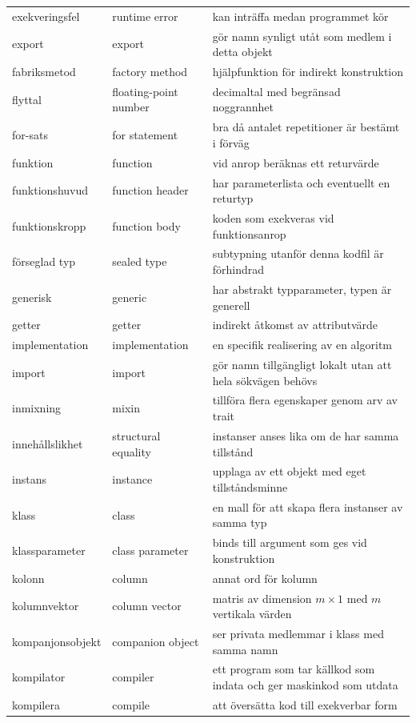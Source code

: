 \begin{tabular}{l|l|l}
exekveringsfel & runtime error & kan inträffa medan programmet kör \\
export & export & gör namn synligt utåt som medlem i detta objekt \\
fabriksmetod & factory method & hjälpfunktion för indirekt konstruktion \\
flyttal & floating-point number & decimaltal med begränsad noggrannhet \\
for-sats & for statement & bra då antalet repetitioner är bestämt i förväg \\
funktion & function & vid anrop beräknas ett returvärde \\
funktionshuvud & function header & har parameterlista och eventuellt en returtyp \\
funktionskropp & function body & koden som exekveras vid funktionsanrop \\
förseglad typ & sealed type & subtypning utanför denna kodfil är förhindrad \\
generisk & generic & har abstrakt typparameter, typen är generell \\
getter & getter & indirekt åtkomst av attributvärde \\
implementation & implementation & en specifik realisering av en algoritm \\
import & import & gör namn tillgängligt lokalt utan att hela sökvägen behövs \\
inmixning & mixin & tillföra flera egenskaper genom arv av trait \\
innehållslikhet & structural equality & instanser anses lika om de har samma tillstånd \\
instans & instance & upplaga av ett objekt med eget tillståndsminne \\
klass & class & en mall för att skapa flera instanser av samma typ \\
klassparameter & class parameter & binds till argument som ges vid konstruktion \\
kolonn & column & annat ord för kolumn \\
kolumnvektor & column vector & matris av dimension $m\times{}1$ med $m$ vertikala värden \\
kompanjonsobjekt & companion object & ser privata medlemmar i klass med samma namn \\
kompilator & compiler & ett program som tar källkod som indata och ger maskinkod som utdata \\
kompilera & compile & att översätta kod till exekverbar form \\

\end{tabular}

